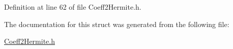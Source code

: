 Definition at line 62 of file Coeff2\+Hermite.\+h.



The documentation for this struct was generated from the following file\+:\begin{DoxyCompactItemize}
\item 
\hyperlink{_coeff2_hermite_8h}{Coeff2\+Hermite.\+h}\end{DoxyCompactItemize}
